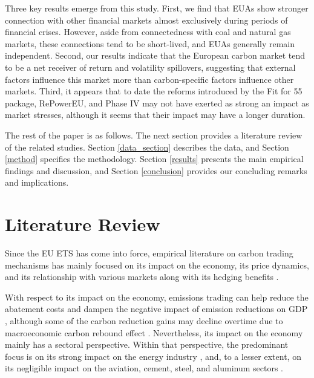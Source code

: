 \documentclass[preprint, 3p,
authoryear]{elsarticle} %
\begin{document}
Three key results emerge from this study. First, we find that EUAs show
stronger connection with other financial markets almost exclusively
during periods of financial crises. However, aside from connectedness
with coal and natural gas markets, these connections tend to be
short-lived, and EUAs generally remain independent. Second, our results
indicate that the European carbon market tend to be a net receiver of
return and volatility spillovers, suggesting that external factors
influence this market more than carbon-specific factors influence other
markets. Third, it appears that to date the reforms introduced by the
Fit for 55 package, RePowerEU, and Phase IV may not have exerted as
strong an impact as market stresses, although it seems that their impact
may have a longer duration.

The rest of the paper is as follows. The next section provides a
literature review of the related studies. Section \ref{data_section}
describes the data, and Section \ref{method} specifies the methodology.
Section \ref{results} presents the main empirical findings and
discussion, and Section \ref{conclusion} provides our concluding remarks
and implications.

\hypertarget{literature-review}{%
\section{Literature Review}\label{literature-review}}

Since the EU ETS has come into force, empirical literature on carbon
trading mechanisms has mainly focused on its impact on the economy, its
price dynamics, and its relationship with various markets along with its
hedging benefits \citep{demiralay_carbon_2022, dai_impact_2022}.

With respect to its impact on the economy, emissions trading can help
reduce the abatement costs and dampen the negative impact of emission
reductions on GDP \citep{wu_achieving_2016, lin_impacts_2019}, although
some of the carbon reduction gains may decline overtime due to
macroeconomic carbon rebound effect \citep{bolat_is_2023}. Nevertheless,
its impact on the economy mainly has a sectoral perspective. Within that
perspective, the predominant focus is on its strong impact on the energy
industry
\citep{delarue_simulating_2007, kara_impacts_2008, zachmann_first_2008, kirat_impact_2011, bonenti_evaluating_2013, hobbie_windfall_2019, hanif_nonlinear_2021, dai_impact_2022},
and, to a lesser extent, on its negligible impact on the aviation,
cement, steel, and aluminum sectors
\citep{VANASSELT2007497, zhang_overview_2010, oberndorfer_costs_2007, efthymiou_eu_2019}.
\end{document}
